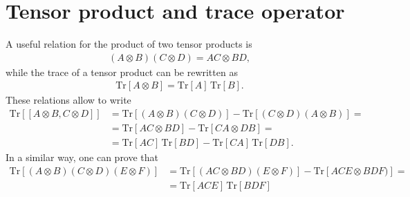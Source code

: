 \section{Tensor product and trace operator} 

A useful relation for the product of two tensor products is
\begin{align}
    (A \otimes B) (C \otimes D) = AC \otimes BD,
\end{align}
while the trace of a tensor product can be rewritten as
\begin{align}
    \text{Tr}[A\otimes B] = \text{Tr}[A] \, \text{Tr}[B].
\end{align}
These relations allow to write
\begin{align}
    \text{Tr}[[A\otimes B, C\otimes D]] &= \text{Tr}[(A\otimes B)(C \otimes D)] - \text{Tr}[(C\otimes D)(A \otimes B)] = \nonumber \\
    &= \text{Tr}[AC \otimes BD] - \text{Tr}[CA \otimes DB] = \nonumber \\
    &= \text{Tr}[AC] \, \text{Tr}[BD] - \text{Tr}[CA] \, \text{Tr}[DB]. 
\end{align}
In a similar way, one can prove that 
\begin{align}
    \text{Tr}[(A\otimes B)(C\otimes D)(E \otimes F)] &= \text{Tr}[(AC \otimes BD)(E \otimes F)] - \text{Tr}[ACE \otimes BDF)] = \nonumber \\
    &= \text{Tr}[ACE] \, \text{Tr}[BDF]
\end{align}
